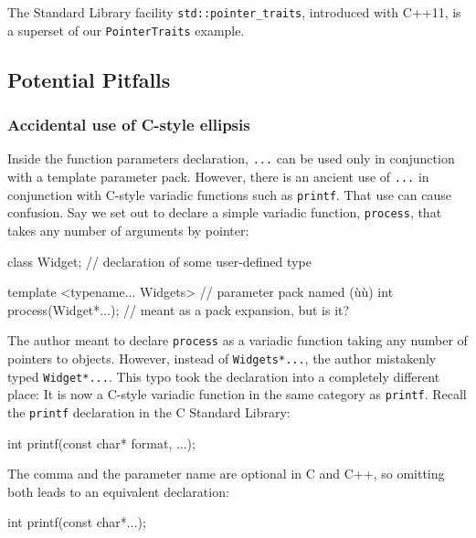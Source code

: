 \noindent The Standard Library facility \lstinline!std::pointer_traits!, introduced
with C++11, is a superset of our \lstinline!PointerTraits! example.

\subsection[Potential Pitfalls]{Potential Pitfalls}\label{potential-pitfalls-variadic}

\subsubsection[Accidental use of C-style ellipsis]{Accidental use of C-style ellipsis}\label{accidental-use-of-c-style-ellipsis}

Inside the function parameters declaration, \lstinline!...! can be used
only in conjunction with a template parameter pack. However, there is an
ancient use of \lstinline!...! in conjunction with C-style variadic
functions such as \lstinline!printf!. That use can cause confusion. Say we
set out to declare a simple variadic function, \lstinline!process!, that
takes any number of arguments by pointer:

\begin{emcppslisting}[emcppsbatch=e40]
class Widget;                   // declaration of some user-defined type

template <typename... Widgets>  // parameter pack named (ù{}ù)
int process(Widget*...);        // meant as a pack expansion, but is it?
\end{emcppslisting}
    

\noindent The author meant to declare \lstinline!process! as a variadic function
taking any number of pointers to objects. However, instead of
\lstinline!Widgets*...!, the author mistakenly typed \lstinline!Widget*...!.
This typo took the declaration into a completely different place: It is
now a C-style variadic function in the same category as \lstinline!printf!.
Recall the \lstinline!printf! declaration in the C Standard Library:

\begin{emcppslisting}[emcppsbatch=e40]
int printf(const char* format, ...);
\end{emcppslisting}
    

\noindent The comma and the parameter name are optional in C and C++, so omitting
both leads to an equivalent declaration:

\begin{emcppslisting}[emcppsbatch=e40]
int printf(const char*...);
\end{emcppslisting}
    

